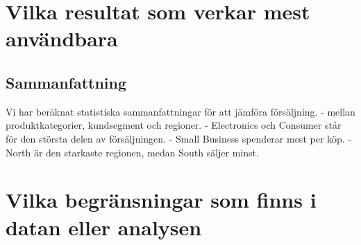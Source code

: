 \documentclass[
]{article}
\begin{document}
\section{Vilka resultat som verkar mest
användbara}\label{vilka-resultat-som-verkar-mest-anvuxe4ndbara}

\subsection{Sammanfattning}\label{sammanfattning}

Vi har beräknat statistiska sammanfattningar för att jämföra
försäljning. - mellan produktkategorier, kundsegment och regioner. -
Electronics och Consumer står för den största delen av försäljningen. -
Small Business spenderar mest per köp. - North är den starkaste
regionen, medan South säljer minst.

\section{Vilka begränsningar som finns i datan eller
analysen}\label{vilka-begruxe4nsningar-som-finns-i-datan-eller-analysen}
\end{document}
